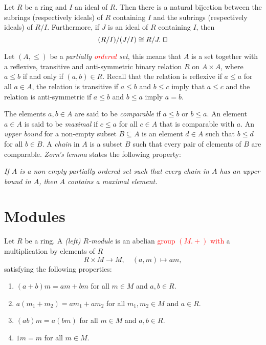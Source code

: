 \begin{theorem} 
Let $R$ be a ring and $I$ an ideal of $R$. Then there is a natural bijection between the subrings (respectively ideals) of $R$ containing $I$ and the subrings (respectively ideals) of $R/I$. 
Furthermore, if $J$ is an ideal of $R$ containing $I$, then
\[
(R/I)/(J/I)\cong R/J.\; \qed
\]
\end{theorem}
Let $(A,\leq)$ be a {\em partially \textcolor{red}{ordered} set}, this means that $A$ is a set together with a 
reflexive, transitive and anti-symmetric binary relation
$R$ on $A\times A$, where $a\leq b$ if and only if $(a,b)\in R$. 
Recall that the relation is reflexive if $a\leq a$ for all $a\in A$, the relation is transitive if 
$a\leq b$ and $b\leq c$ imply that 
$a\leq c$ and the relation is anti-symmetric if $a\leq b$ and $b\leq a$ imply $a=b$.

The elements $a,b\in A$ are said to be {\em comparable} if $a\leq b$ or $b\leq
a$. An element $a\in A$ is said to be {\em maximal} if 
$c\leq a$ 
for all $c\in A$
that is comparable with $a$. 
An {\em upper bound} for a non-empty subset $B\subseteq A$ is an element $d\in
A$ such that $b\leq d$ for all $b\in B$. A {\em chain} in $A$ is a subset 
$B$ such that every pair of elements of $B$ are comparable. 
{\em Zorn's lemma} states the following property: 
\medskip

{\em If $A$ is a non-empty partially ordered set such that every chain in 
	$A$ has an upper bound in $A$, then $A$ contains a maximal element.} 

\section{Modules}

Let $R$ be a ring. A \emph{(left) $R$-module} is an abelian \textcolor{red}{group $(M.+)$ with} a multiplication by elements of $R$
\[
R\times M\to M,\quad
(a,m)\mapsto am,
\]
satisfying the following properties:
\begin{enumerate}
	\item $(a+b)m=am+bm$ for all $m\in M$ and $a,b\in R$. 
    \item $a(m_1+m_2)=am_1+am_2$ for all $m_1,m_2\in M$ and $a\in R$.
    \item $(ab)m=a(bm)$ for all $m\in M$ and $a,b\in R$.
    \item $1m=m$ for all $m\in M$.
\end{enumerate}


